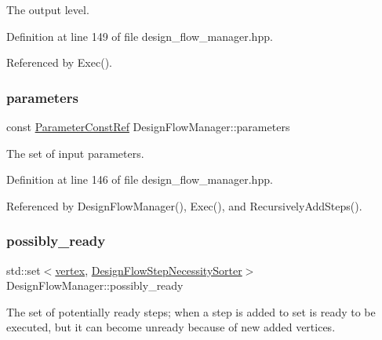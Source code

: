 The output level. 



Definition at line 149 of file design\+\_\+flow\+\_\+manager.\+hpp.



Referenced by Exec().

\mbox{\label{classDesignFlowManager_a445e732d3d9516b40ad5862519a01cfc}} 
\subsubsection{\texorpdfstring{parameters}{parameters}}
{\footnotesize\ttfamily const \hyperlink{Parameter_8hpp_a37841774a6fcb479b597fdf8955eb4ea}{Parameter\+Const\+Ref} Design\+Flow\+Manager\+::parameters\hspace{0.3cm}{\ttfamily [private]}}



The set of input parameters. 



Definition at line 146 of file design\+\_\+flow\+\_\+manager.\+hpp.



Referenced by Design\+Flow\+Manager(), Exec(), and Recursively\+Add\+Steps().

\mbox{\label{classDesignFlowManager_ac3a34b1fa14762e16309115e92a38fd9}} 
\subsubsection{\texorpdfstring{possibly\+\_\+ready}{possibly\_ready}}
{\footnotesize\ttfamily std\+::set$<$\hyperlink{graph_8hpp_abefdcf0544e601805af44eca032cca14}{vertex}, \hyperlink{classDesignFlowStepNecessitySorter}{Design\+Flow\+Step\+Necessity\+Sorter}$>$ Design\+Flow\+Manager\+::possibly\+\_\+ready\hspace{0.3cm}{\ttfamily [private]}}



The set of potentially ready steps; when a step is added to set is ready to be executed, but it can become unready because of new added vertices. 



